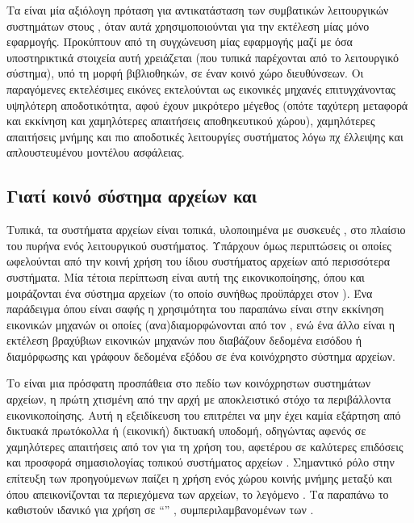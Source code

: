 Τα  είναι μία αξιόλογη πρόταση για αντικατάσταση των συμβατικών
λειτουργικών συστημάτων στους , όταν αυτά χρησιμοποιούνται για την
εκτέλεση μίας μόνο εφαρμογής. Προκύπτουν από τη συγχώνευση μίας εφαρμογής μαζί
με όσα υποστηρικτικά στοιχεία αυτή χρειάζεται (που τυπικά παρέχονται από το
λειτουργικό σύστημα), υπό τη μορφή βιβλιοθηκών, σε έναν κοινό χώρο διευθύνσεων.
Οι παραγόμενες εκτελέσιμες εικόνες εκτελούνται ως εικονικές μηχανές
επιτυγχάνοντας υψηλότερη αποδοτικότητα, αφού έχουν μικρότερο μέγεθος (οπότε
ταχύτερη μεταφορά και εκκίνηση \cite{jitsu} και χαμηλότερες απαιτήσεις
αποθηκευτικού χώρου), χαμηλότερες απαιτήσεις μνήμης και πιο αποδοτικές
λειτουργίες συστήματος λόγω πχ έλλειψης  και απλουστευμένου
μοντέλου ασφάλειας.

\subsection{Γιατί κοινό σύστημα αρχείων και \viofs{}}
Τυπικά, τα συστήματα αρχείων είναι τοπικά, υλοποιημένα με συσκευές ,
στο πλαίσιο του πυρήνα ενός λειτουργικού συστήματος. Υπάρχουν όμως περιπτώσεις
οι οποίες ωφελούνται από την κοινή χρήση του ίδιου συστήματος αρχείων από
περισσότερα συστήματα. Μία τέτοια περίπτωση είναι αυτή της εικονικοποίησης, όπου
\host{} και \guest{} μοιράζονται ένα σύστημα αρχείων (το οποίο συνήθως
προϋπάρχει στον \host{}). Ένα παράδειγμα όπου είναι σαφής η χρησιμότητα του
παραπάνω είναι στην εκκίνηση εικονικών μηχανών οι οποίες (ανα)διαμορφώνονται από
τον \host{}, ενώ ένα άλλο είναι η εκτέλεση βραχύβιων εικονικών μηχανών που
διαβάζουν δεδομένα εισόδου ή διαμόρφωσης και γράφουν δεδομένα εξόδου σε ένα
κοινόχρηστο σύστημα αρχείων.

Το \viofs{} είναι μια πρόσφατη προσπάθεια στο πεδίο των κοινόχρηστων συστημάτων
αρχείων, η πρώτη χτισμένη από την αρχή με αποκλειστικό στόχο τα περιβάλλοντα
εικονικοποίησης. Αυτή η εξειδίκευση του επιτρέπει να μην έχει καμία εξάρτηση
από δικτυακά πρωτόκολλα ή (εικονική) δικτυακή υποδομή, οδηγώντας αφενός σε
χαμηλότερες απαιτήσεις από τον \guest{} για τη χρήση του, αφετέρου σε καλύτερες
επιδόσεις και προσφορά σημασιολογίας τοπικού συστήματος αρχείων
\cite{virtiofs-website}. Σημαντικό ρόλο στην επίτευξη των προηγούμενων παίζει η
χρήση ενός χώρου κοινής μνήμης μεταξύ \host{} και \guest{} όπου απεικονίζονται
τα περιεχόμενα των αρχείων, το λεγόμενο . Τα
παραπάνω το καθιστούν ιδανικό για χρήση σε ``'' ,
συμπεριλαμβανομένων των .

